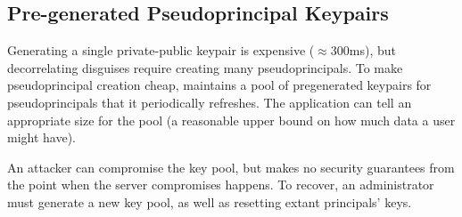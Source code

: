 \subsection{Pre-generated Pseudoprincipal Keypairs}
%
Generating a single private-public keypair is expensive ($\approx$300ms), but
decorrelating disguises require creating many pseudoprincipals.
%
To make pseudoprincipal creation cheap, \sys maintains a pool of
pregenerated keypairs for pseudoprincipals that it periodically refreshes.
%
The application can tell \sys an appropriate size for the pool (\eg a reasonable
upper bound on how much data a user might have).
%

%
An attacker can compromise the key pool, but \sys makes no security guarantees
from the point when the server compromises happens.
%
To recover, an administrator must generate a new key pool, as well as resetting
extant principals' keys.
%

%

